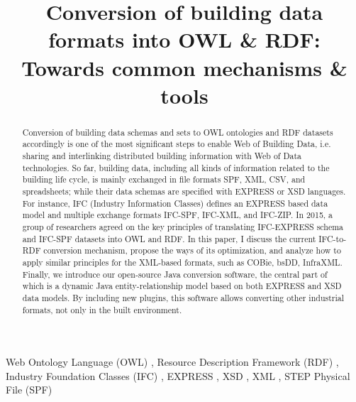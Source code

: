 \begin{frontmatter}

\title{Conversion of building data formats into OWL \& RDF: Towards common mechanisms \& tools}



\author{ }
\address{Aalto University, Espoo, Finland\\Email: nam.vuhoang@aalto.fi}
\runningauthor{}

\begin{abstract}
Conversion of building data schemas and sets to OWL ontologies and RDF datasets accordingly is one of the most significant steps to enable Web of Building Data, i.e. sharing and interlinking distributed building information with Web of Data technologies.
So far, building data, including all kinds of information related to the building life cycle, is mainly exchanged in file formats SPF, XML, CSV, and spreadsheets; while their data schemas are specified with EXPRESS or XSD languages.
For instance, IFC (Industry Information Classes) defines an EXPRESS based data model and multiple exchange formats IFC-SPF, IFC-XML, and IFC-ZIP.
In 2015, a group of researchers agreed on the key principles of translating IFC-EXPRESS schema and IFC-SPF datasets into OWL and RDF.
In this paper, I discuss the current IFC-to-RDF conversion mechanism, propose the ways of its optimization, and analyze how to apply similar principles for the XML-based formats, such as COBie, bsDD, InfraXML.
Finally, we introduce our open-source Java conversion software, the central part of which is a dynamic Java entity-relationship model based on both EXPRESS and XSD data models.
By including new plugins, this software allows converting other industrial formats, not only in the built environment. 
 
\end{abstract}

\begin{keyword}
 Web Ontology Language (OWL)
 \sep
 Resource Description Framework (RDF)
 \sep
 Industry Foundation Classes (IFC)
 \sep
 EXPRESS
 \sep
 XSD
 \sep
 XML
 \sep
 STEP Physical File (SPF)
\end{keyword}

\end{frontmatter}